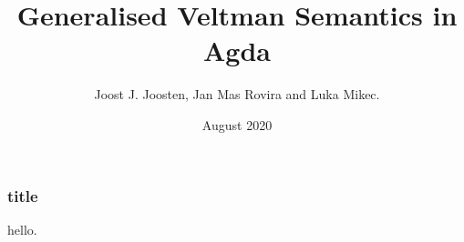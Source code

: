 \documentclass{beamer}
\title{Generalised Veltman Semantics in Agda}
\author{Joost J. Joosten, Jan Mas Rovira and Luka Mikec.}
\institute{Universitat de Barcelona}
\date{August 2020}
\begin{document}
\frame{\titlepage}

\begin{frame}
  \frametitle{title}
  hello.
\end{frame}
\end{document}
